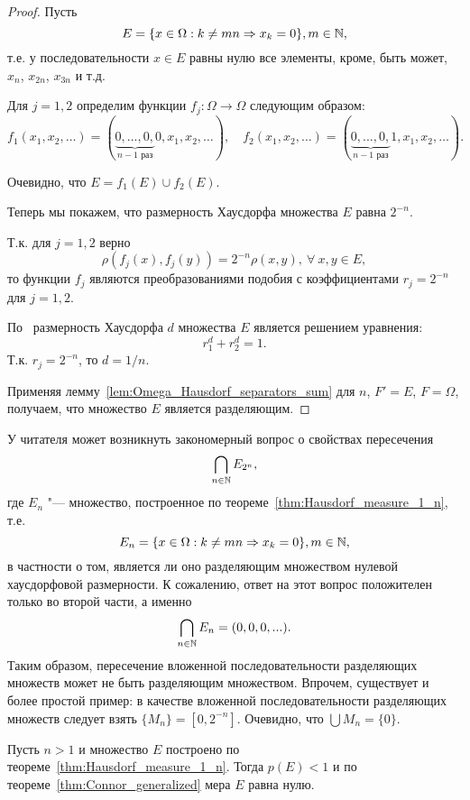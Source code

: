 \begin{proof}
	Пусть
	\begin{equation}
		E= \{ x \in \Omega : k \neq mn \Rightarrow x_k = 0\}, m\in \mathbb{N}
		,
	\end{equation}
	т.е. у последовательности $x \in E$ равны нулю все элементы, кроме, быть может, $x_n$, $x_{2n}$, $x_{3n}$ и т.д.

	Для $j=1,2$ определим функции $f_j : \Omega \to \Omega$ следующим образом:
	\begin{equation}
		f_1(x_1, x_2, \dots)=(\underbrace{0, ..., 0,}_{\mbox{$n-1$ раз}} 0, x_1, x_2, \dots)
		,
		\quad
		f_2(x_1, x_2, \dots)=(\underbrace{0, ..., 0,}_{\mbox{$n-1$ раз}} 1, x_1, x_2, \dots)
		.
	\end{equation}

	Очевидно, что $E=f_1(E)\cup f_2(E).$

	Теперь мы покажем, что размерность Хаусдорфа множества $E$ равна $2^{-n}$.

	Т.к. для $j=1,2$ верно
	 $$\rho(f_j(x),f_j(y))=2^{-n}\rho(x,y), \ \forall \ x, y \in E,$$
	 то функции $f_j$ являются преобразованиями подобия с коэффициентами $r_j=2^{-n}$ для $j=1,2$.


	По~\cite[Теорема 9.3]{Edgar} размерность Хаусдорфа $d$ множества $E$ является решением уравнения:
	$$ r_1^d+r_2^d=1.$$
	Т.к. $r_j=2^{-n}$, то
	$d=1/n.$

	Применяя лемму~\ref{lem:Omega_Hausdorf_separators_sum}
	для $n$, $F'=E$, $F=\Omega$, получаем, что множество $E$ является разделяющим.
\end{proof}

\begin{remark}
	У читателя может возникнуть закономерный вопрос о свойствах пересечения
	\begin{equation}
		\bigcap_{n\in \mathbb{N}} E_{2^n}
		,
	\end{equation}
	где $E_n$ "--- множество, построенное по теореме~\ref{thm:Hausdorf_measure_1_n}, т.е.
	\begin{equation}
		E_n = \{ x \in \Omega : k \neq mn \Rightarrow x_k = 0\}, m\in \mathbb{N}
		,
	\end{equation}
	в частности о том, является ли оно разделяющим множеством нулевой хаусдорфовой размерности.
	К сожалению, ответ на этот вопрос положителен только во второй части, а именно
	\begin{equation}
		\bigcap_{n\in \mathbb{N}} E_n = {(0,0,0,...)}
		.
	\end{equation}
	Таким образом, пересечение вложенной последовательности разделяющих множеств может не быть разделяющим множеством.
	Впрочем, существует и более простой пример:
	в качестве вложенной последовательности разделяющих множеств следует взять $\{M_n\} = [0, 2^{-n}]$.
	Очевидно, что $\bigcup\limits M_n = \{0\}$.
\end{remark}


\begin{remark}
	Пусть $n>1$ и множество $E$ построено по теореме~\ref{thm:Hausdorf_measure_1_n}.
	Тогда $p(E)< 1$ и по теореме~\ref{thm:Connor_generalized} мера $E$ равна нулю.
\end{remark}
